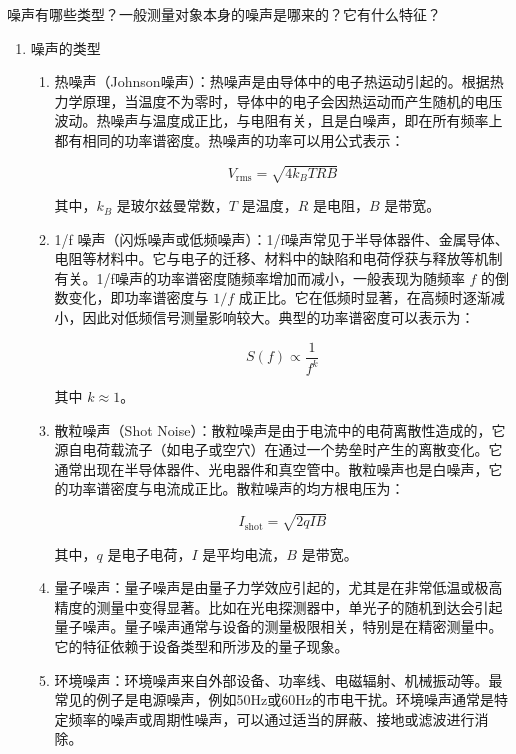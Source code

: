 \begin{question}
	噪声有哪些类型？一般测量对象本身的噪声是哪来的？它有什么特征？
\end{question}
\begin{enumerate}
	\item 噪声的类型
	\begin{enumerate}
		\item 热噪声（Johnson噪声）：热噪声是由导体中的电子热运动引起的。根据热力学原理，当温度不为零时，导体中的电子会因热运动而产生随机的电压波动。热噪声与温度成正比，与电阻有关，且是白噪声，即在所有频率上都有相同的功率谱密度。热噪声的功率可以用公式表示：
		
		\[
		V_{\text{rms}} = \sqrt{4k_B T R B}
		\]
		
		其中，\( k_B \) 是玻尔兹曼常数，\( T \) 是温度，\( R \) 是电阻，\( B \) 是带宽。
		
		\item 1/f 噪声（闪烁噪声或低频噪声）：1/f噪声常见于半导体器件、金属导体、电阻等材料中。它与电子的迁移、材料中的缺陷和电荷俘获与释放等机制有关。1/f噪声的功率谱密度随频率增加而减小，一般表现为随频率 \( f \) 的倒数变化，即功率谱密度与 \( 1/f \) 成正比。它在低频时显著，在高频时逐渐减小，因此对低频信号测量影响较大。典型的功率谱密度可以表示为：
		 
		\[
		S(f) \propto \frac{1}{f^k}
		\]
		 
		其中 \( k \approx 1 \)。
		
		\item 散粒噪声（Shot Noise）：散粒噪声是由于电流中的电荷离散性造成的，它源自电荷载流子（如电子或空穴）在通过一个势垒时产生的离散变化。它通常出现在半导体器件、光电器件和真空管中。散粒噪声也是白噪声，它的功率谱密度与电流成正比。散粒噪声的均方根电压为：
		 
		\[
		I_{\text{shot}} = \sqrt{2qI B}
		\]
		
		其中，\( q \) 是电子电荷，\( I \) 是平均电流，\( B \) 是带宽。
		
		\item 量子噪声：量子噪声是由量子力学效应引起的，尤其是在非常低温或极高精度的测量中变得显著。比如在光电探测器中，单光子的随机到达会引起量子噪声。量子噪声通常与设备的测量极限相关，特别是在精密测量中。它的特征依赖于设备类型和所涉及的量子现象。
		
		\item 环境噪声：环境噪声来自外部设备、功率线、电磁辐射、机械振动等。最常见的例子是电源噪声，例如50Hz或60Hz的市电干扰。环境噪声通常是特定频率的噪声或周期性噪声，可以通过适当的屏蔽、接地或滤波进行消除。
	\end{enumerate}
	

\end{enumerate}
